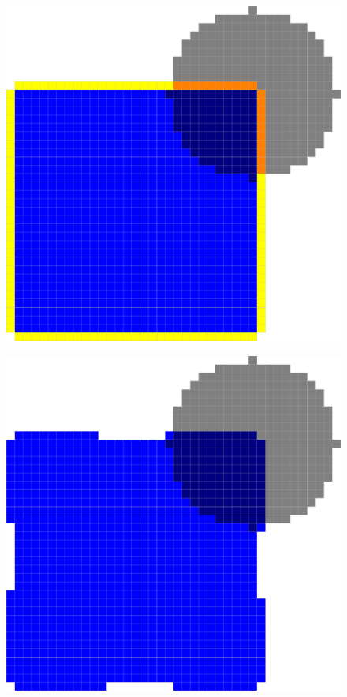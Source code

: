 \begin{figure}
\begin{minipage}{0.49\textwidth}
\center
\includegraphics[scale=0.15]{figures/chapter6/contour-information/before-opt.pdf}
\label{ch6:fig:contour-info-1}
\end{minipage}%
\begin{minipage}{0.49\textwidth}
\center
\includegraphics[scale=0.15]{figures/chapter6/contour-information/after-opt.pdf}

\end{minipage}
\end{figure}
